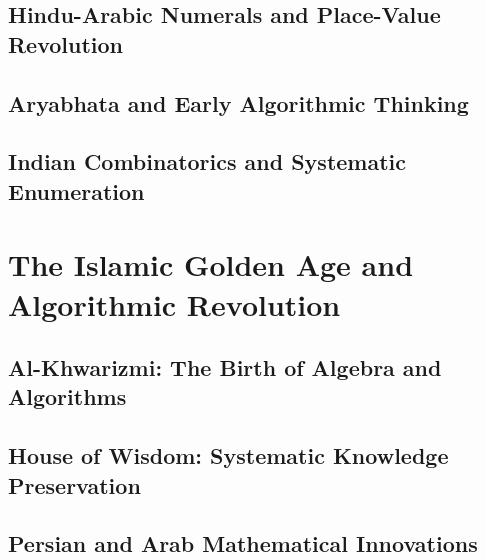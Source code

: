 \documentclass[12pt, oneside, openany]{book}
\let\oldchapter\chapter
\renewcommand{\chapter}{
	\cleardoublepage
	\thispagestyle{chapter}
	\oldchapter
}
\begin{document}
\section{Hindu-Arabic Numerals and Place-Value Revolution}

\section{Aryabhata and Early Algorithmic Thinking}

\section{Indian Combinatorics and Systematic Enumeration}


\chapter{The Islamic Golden Age and Algorithmic Revolution}

\section{Al-Khwarizmi: The Birth of Algebra and Algorithms}

\section{House of Wisdom: Systematic Knowledge Preservation}

\section{Persian and Arab Mathematical Innovations}
\end{document}
